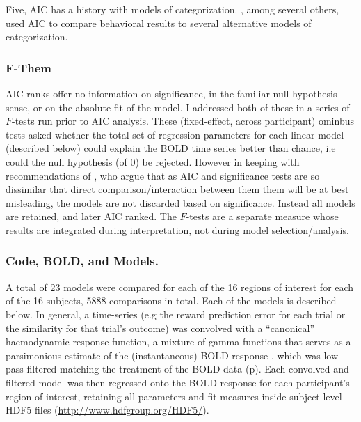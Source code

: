 \documentclass[doc,12pt]{apa}        %
\begin{document}
    Five, AIC has a history with models of categorization. , among several others, used AIC to compare behavioral results to several alternative models of categorization.  

\subsubsection{F-Them}
\label{subsub:F}
AIC ranks offer no information on significance, in the familiar null hypothesis sense, or on the absolute fit of the model.  I addressed both of these in a series of $F$-tests run prior to AIC analysis.  These (fixed-effect, across participant) ominbus tests asked whether the total set of regression parameters for each linear model (described below) could explain the BOLD time series better than chance, i.e could the null hypothesis (of 0) be rejected.  However in keeping with recommendations of , who argue that as AIC and significance tests are so dissimilar that direct comparison/interaction between them them will be at best misleading, the models are not discarded based on significance.  Instead all models are retained, and later AIC ranked.  The $F$-tests are a separate measure whose results are integrated during interpretation, not during model selection/analysis.

\subsubsection{Code, BOLD, and Models.}
\label{sub:cmb}
A total of 23 models were compared for each of the 16 regions of interest for each of the 16 subjects, 5888 comparisons in total.  Each of the models is described below.  In general, a time-series (e.g the reward prediction error for each trial or the similarity for that trial's outcome) was convolved with a ``canonical''  haemodynamic response function, a mixture of gamma functions that serves as a parsimonious estimate of the (instantaneous) BOLD response \cite{Friston:1998p2022}, which was low-pass filtered matching the treatment of the BOLD data (p\pageref{subsub:preprocessed}).  Each convolved and filtered model was then regressed onto the BOLD response for each participant's region of interest, retaining all parameters and fit measures inside subject-level HDF5 files (\url{http://www.hdfgroup.org/HDF5/}).  
\end{document}
